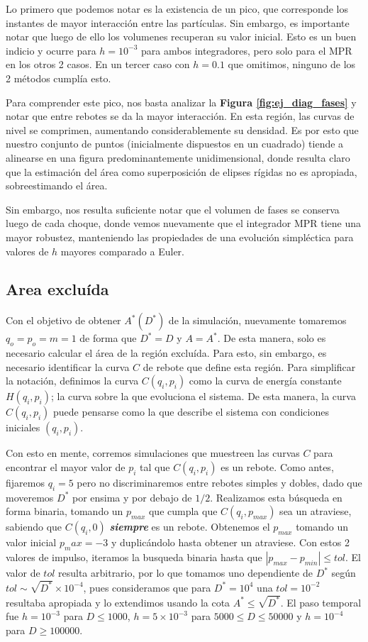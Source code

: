 Lo primero que podemos notar es la existencia de un pico, que corresponde los instantes de mayor interacción entre las partículas.
Sin embargo, es importante notar que luego de ello los volumenes recuperan su valor inicial.
Esto es un buen indicio y ocurre para $h=10^{-3}$ para ambos integradores, pero solo para el MPR en los otros 2 casos.
En un tercer caso con $h=0.1$ que omitimos, ninguno de los 2 métodos cumplía esto.

Para comprender este pico, nos basta analizar la \textbf{Figura \ref{fig:ej_diag_fases}} y notar que entre rebotes se da la mayor interacción.
En esta región, las curvas de nivel se comprimen, aumentando considerablemente su densidad. 
Es por esto que nuestro conjunto de puntos (inicialmente dispuestos en un cuadrado) tiende a alinearse en una figura predominantemente unidimensional, donde resulta claro que la estimación del área 
como superposición de elipses rígidas no es apropiada, sobreestimando el área.

Sin embargo, nos resulta suficiente notar que el volumen de fases se conserva luego de cada choque, donde vemos nuevamente que el integrador MPR tiene una mayor robustez, 
manteniendo las propiedades de una evolución simpléctica para valores de $h$ mayores comparado a Euler.


\subsection{Area excluída}{\label{sec:area_ex_comp}}

Con el objetivo de obtener $A^*(D^*)$ de la simulación, nuevamente tomaremos $q_o = p_o = m = 1$ de forma que $D^* = D$ y $A=A^*$.
De esta manera, solo es necesario calcular el área de la región excluída.
Para esto, sin embargo, es necesario identificar la curva $C$ de rebote que define esta región.
Para simplificar la notación, definimos la curva $C(q_i,p_i)$ como la curva de energía constante $H(q_i,p_i)$; la curva sobre la que evoluciona el sistema.
De esta manera, la curva $C(q_i,p_i)$ puede pensarse como la que describe el sistema con condiciones iniciales $(q_i,p_i)$.

Con esto en mente, corremos simulaciones que muestreen las curvas $C$ para encontrar el mayor valor de $p_i$ tal que $C(q_i, p_i)$ es un rebote.
Como antes, fijaremos $q_i=5$ pero no discriminaremos entre rebotes simples y dobles, dado que moveremos $D^*$ por ensima y por debajo de $1/2$.
Realizamos esta búsqueda en forma binaria, tomando un $p_{max}$ que cumpla que $C(q_i, p_{max})$ sea un atraviese, sabiendo que $C(q_i, 0)$ \textbf{\textit{siempre}} es un rebote.
Obtenemos el $p_{max}$ tomando un valor inicial $p_max = -3$ y duplicándolo hasta obtener un atraviese.
Con estos 2 valores de impulso, iteramos la busqueda binaria hasta que $|p_{max}-p_{min}|\leq tol$.
El valor de $tol$ resulta arbitrario, por lo que tomamos uno dependiente de $D^*$ según $tol \sim \sqrt{D^*}\times 10^{-4}$, pues consideramos que para $D^*=10^4$ 
una $tol = 10^{-2}$ resultaba apropiada y lo extendimos usando la cota $A^*\leq \sqrt{D^*}$.
El paso temporal fue $h=10^{-3}$ para $D\leq 1000$, $h=5\times10^{-3}$ para $5000\leq D\leq 50000$ y $h=10^{-4}$ para $D\geq 100000$.


